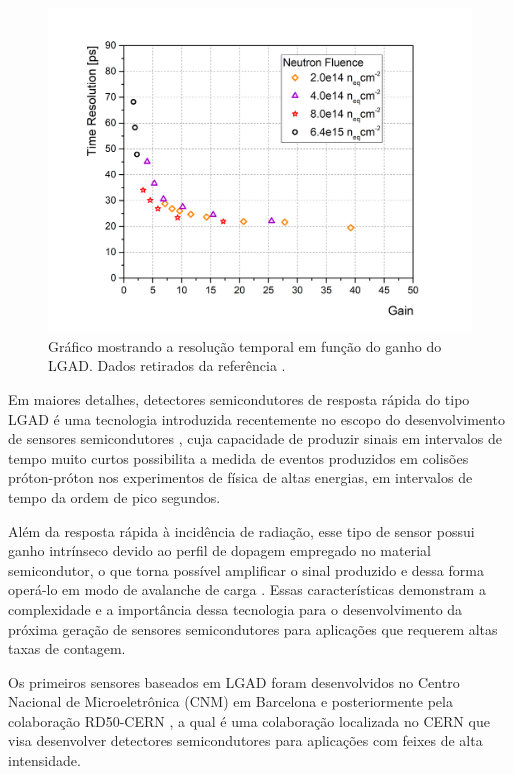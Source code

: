 \begin{figure} 
    \centering
    \includegraphics[width=12.0cm]{assets/timeresolution_vs_gain.png}
    \caption{ Gráfico mostrando a resolução temporal em função do ganho do LGAD. Dados retirados da referência \cite{tdr}.}
    \label{timeresolution}
\end{figure}

Em maiores detalhes, detectores semicondutores de resposta rápida do tipo LGAD é uma tecnologia introduzida recentemente no escopo do desenvolvimento de sensores semicondutores \cite{JIN_LGAD,NIMA_LGAD}, cuja capacidade de produzir sinais em intervalos de tempo muito curtos possibilita a medida de eventos produzidos em colisões próton-próton nos experimentos de física de altas energias, em intervalos de tempo da ordem de pico segundos. 

Além da resposta rápida à incidência de radiação, esse tipo de sensor possui ganho intrínseco devido ao perfil de dopagem empregado no material semicondutor, o que torna possível amplificar o sinal produzido e dessa forma operá-lo em modo de avalanche de carga \cite{JIN_LGAD,NIMA_LGAD}. Essas características demonstram a complexidade e a importância dessa tecnologia para o desenvolvimento da próxima geração de sensores semicondutores para aplicações que requerem altas taxas de contagem.

Os primeiros sensores baseados em LGAD foram desenvolvidos no Centro Nacional de Microeletrônica (CNM) em Barcelona e posteriormente pela colaboração RD50-CERN \cite{tdr,JIN_LGAD,NIMA_LGAD}, a qual é uma colaboração localizada no CERN que visa desenvolver detectores semicondutores para aplicações com feixes de alta intensidade.%

